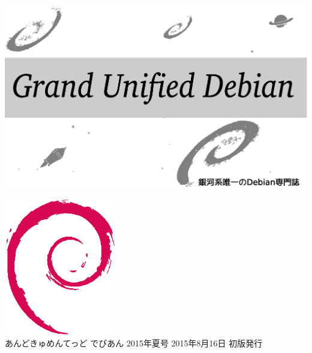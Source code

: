 \documentclass[mingoth,a4paper]{jsarticle}
\begin{document}
\begin{titlepage}
\thispagestyle{empty}

\hspace*{-2.5cm}
\includegraphics{image2012-natsu/gudeb.eps}\\
\vspace*{0.1cm}

\vspace*{2cm}

\vspace*{-1.5cm}
\hspace*{11cm}\includegraphics[height=6cm]{image200502/openlogo-nd.eps}\\
\vspace*{0.1cm}
\hfill あんどきゅめんてっど でびあん 2015年夏号 2015年8月16日 初版発行
\end{titlepage}

\newpage
\thispagestyle{empty}\mbox{}
\newpage
\end{document}
